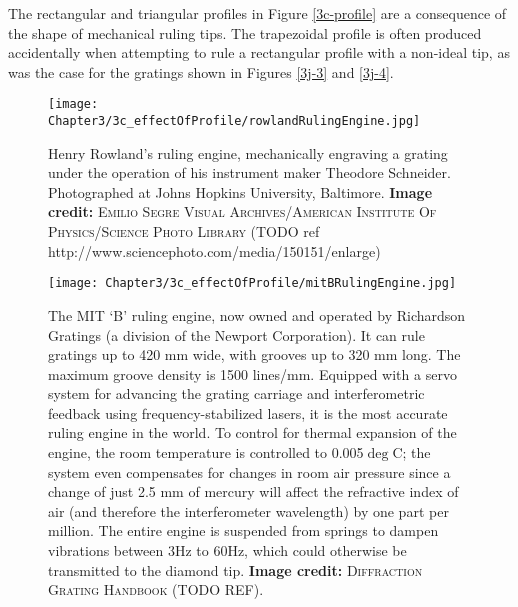 The rectangular and triangular profiles in Figure \ref{3c-profile} are a consequence of the shape of mechanical ruling tips.  The trapezoidal profile is often produced accidentally when attempting to rule a rectangular profile with a non-ideal tip, as was the case for the gratings shown in Figures \ref{3j-3} and \ref{3j-4}.

\begin{figure}[htbp] %
   \centering
   \texttt{[image: Chapter3/3c\_effectOfProfile/rowlandRulingEngine.jpg]}
   \caption[Henry Rowland's ruling engine, mechanically engraving a grating under the operation of his instrument maker Theodore Schneider.]{Henry Rowland's ruling engine, mechanically engraving a grating under the operation of his instrument maker Theodore Schneider.  Photographed at Johns Hopkins University, Baltimore.  \textbf{Image credit: }\textsc{Emilio Segre Visual Archives/American Institute Of Physics/Science Photo Library} (TODO ref http://www.sciencephoto.com/media/150151/enlarge)}
   \label{3c-rowlandEngine}
\end{figure}

\begin{figure}[htbp] %
   \centering
   \texttt{[image: Chapter3/3c\_effectOfProfile/mitBRulingEngine.jpg]}
   \caption[The MIT `B' ruling engine, now owned and operated by Richardson Gratings (a division of the Newport Corporation).]{The MIT `B' ruling engine, now owned and operated by Richardson Gratings (a division of the Newport Corporation).  It can rule gratings up to 420 mm wide, with grooves up to 320 mm long.  The maximum groove density is 1500 lines/mm.  Equipped with a servo system for advancing the grating carriage and interferometric feedback using frequency-stabilized lasers, it is the most accurate ruling engine in the world.  To control for thermal expansion of the engine, the room temperature is controlled to 0.005$\deg$C; the system even compensates for changes in room air pressure since a change of just 2.5 mm of mercury will affect the refractive index of air (and therefore the interferometer wavelength) by one part per million.  The entire engine is suspended from springs to dampen vibrations between 3Hz to 60Hz, which could otherwise be transmitted to the diamond tip.  \textbf{Image credit: }\textsc{Diffraction Grating Handbook} (TODO REF).}
   \label{3c-mitBEngine}
\end{figure}

